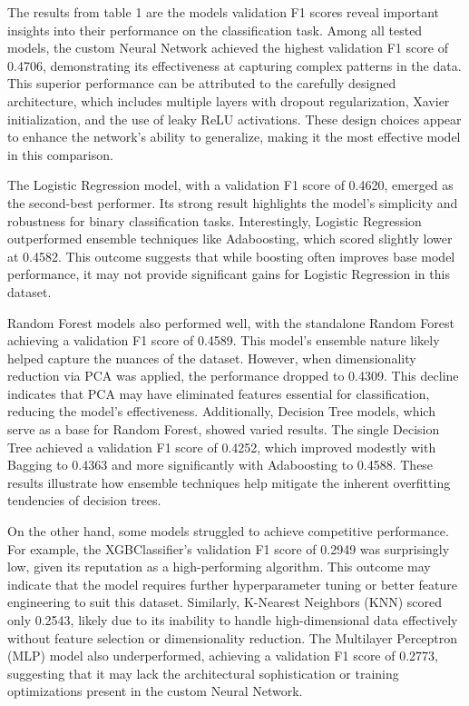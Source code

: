 \documentclass{article} %
\begin{document}
The results from table 1 are the models validation F1 scores reveal important insights into their performance on the classification task. Among all tested models, the custom Neural Network achieved the highest validation F1 score of 0.4706, demonstrating its effectiveness at capturing complex patterns in the data. This superior performance can be attributed to the carefully designed architecture, which includes multiple layers with dropout regularization, Xavier initialization, and the use of leaky ReLU activations. These design choices appear to enhance the network's ability to generalize, making it the most effective model in this comparison.

The Logistic Regression model, with a validation F1 score of 0.4620, emerged as the second-best performer. Its strong result highlights the model's simplicity and robustness for binary classification tasks. Interestingly, Logistic Regression outperformed ensemble techniques like Adaboosting, which scored slightly lower at 0.4582. This outcome suggests that while boosting often improves base model performance, it may not provide significant gains for Logistic Regression in this dataset.

Random Forest models also performed well, with the standalone Random Forest achieving a validation F1 score of 0.4589. This model's ensemble nature likely helped capture the nuances of the dataset. However, when dimensionality reduction via PCA was applied, the performance dropped to 0.4309. This decline indicates that PCA may have eliminated features essential for classification, reducing the model's effectiveness. Additionally, Decision Tree models, which serve as a base for Random Forest, showed varied results. The single Decision Tree achieved a validation F1 score of 0.4252, which improved modestly with Bagging to 0.4363 and more significantly with Adaboosting to 0.4588. These results illustrate how ensemble techniques help mitigate the inherent overfitting tendencies of decision trees.

On the other hand, some models struggled to achieve competitive performance. For example, the XGBClassifier's validation F1 score of 0.2949 was surprisingly low, given its reputation as a high-performing algorithm. This outcome may indicate that the model requires further hyperparameter tuning or better feature engineering to suit this dataset. Similarly, K-Nearest Neighbors (KNN) scored only 0.2543, likely due to its inability to handle high-dimensional data effectively without feature selection or dimensionality reduction. The Multilayer Perceptron (MLP) model also underperformed, achieving a validation F1 score of 0.2773, suggesting that it may lack the architectural sophistication or training optimizations present in the custom Neural Network.
\end{document}
